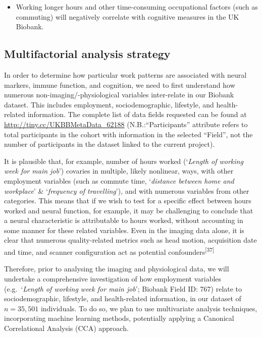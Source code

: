 \documentclass[
  english,
  man, donotrepeattitle]{apa6}
\providecommand{\tightlist}{%
  \setlength{\itemsep}{0pt}\setlength{\parskip}{0pt}}
\begin{document}
\begin{itemize}
\tightlist
\item
  Working longer hours and other time-consuming occupational factors (such as commuting) will negatively correlate with cognitive measures in the UK Biobank.
\end{itemize}

\newpage

\hypertarget{multifactorial-analysis-strategy}{%
\subsection{Multifactorial analysis strategy}\label{multifactorial-analysis-strategy}}

In order to determine how particular work patterns are associated with neural markers, immune function, and cognition, we need to first understand how numerous non-imaging/-physiological variables inter-relate in our Biobank dataset. This includes employment, sociodemographic, lifestyle, and health-related information. The complete list of data fields requested can be found at \url{http://tiny.cc/UKBBMetaData_62188} (N.B.:``Participants'' attribute refers to total participants in the cohort with information in the selected ``Field'', not the number of participants in the dataset linked to the current project).

It is plausible that, for example, number of hours worked (`\emph{Length of working week for main job}') covaries in multiple, likely nonlinear, ways, with other employment variables (such as commute time, `\emph{distance between home and workplace}' \& `\emph{frequency of travelling}'), and with numerous variables from other categories. This means that if we wish to test for a specific effect between hours worked and neural function, for example, it may be challenging to conclude that a neural characteristic is attributable to hours worked, without accounting in some manner for these related variables. Even in the imaging data alone, it is clear that numerous quality-related metrics such as head motion, acquisition date and time, and scanner configuration act as potential confounders\textsuperscript{{[}37{]}}

Therefore, prior to analysing the imaging and physiological data, we will undertake a comprehensive investigation of how employment variables (e.g.~`\emph{Length of working week for main job}'; Biobank Field ID: 767) relate to sociodemographic, lifestyle, and health-related information, in our dataset of \(n=35,501\) individuals. To do so, we plan to use multivariate analysis techniques, incorporating machine learning methods, potentially applying a Canonical Correlational Analysis (CCA) approach.
\end{document}
